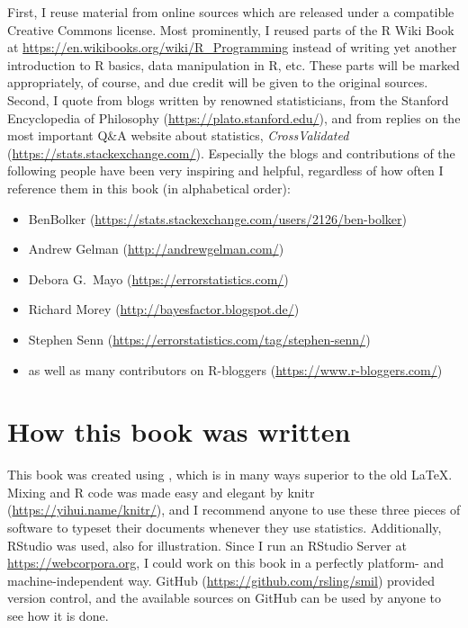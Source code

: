 First, I reuse material from online sources which are released under a compatible Creative Commons license.
Most prominently, I reused parts of the R Wiki Book at \url{https://en.wikibooks.org/wiki/R_Programming} instead of writing yet another introduction to R basics, data manipulation in R, etc.
These parts will be marked appropriately, of course, and due credit will be given to the original sources.
Second, I quote from blogs written by renowned statisticians, from the Stanford Encyclopedia of Philosophy (\url{https://plato.stanford.edu/}), and from replies on the most important Q\&A website about statistics, \textit{CrossValidated} (\url{https://stats.stackexchange.com/}).
Especially the blogs and contributions of the following people have been very inspiring and helpful, regardless of how often I reference them in this book (in alphabetical order):

\begin{itemize}
  \item BenBolker (\url{https://stats.stackexchange.com/users/2126/ben-bolker})
  \item Andrew Gelman (\url{http://andrewgelman.com/})
  \item Debora G.\ Mayo (\url{https://errorstatistics.com/})
  \item Richard Morey (\url{http://bayesfactor.blogspot.de/})
  \item Stephen Senn (\url{https://errorstatistics.com/tag/stephen-senn/})
  \item as well as many contributors on R-bloggers (\url{https://www.r-bloggers.com/})
\end{itemize}


\section*{How this book was written}

This book was created using \XeLaTeX, which is in many ways superior to the old \LaTeX.
Mixing \XeLaTeX and R code was made easy and elegant by knitr (\url{https://yihui.name/knitr/}), and I recommend anyone to use these three pieces of software to typeset their documents whenever they use statistics.
Additionally, RStudio was used, also for illustration.
Since I run an RStudio Server at \url{https://webcorpora.org}, I could work on this book in a perfectly platform- and machine-independent way.
GitHub (\url{https://github.com/rsling/smil}) provided version control, and the available sources on GitHub can be used by anyone to see how it is done.
